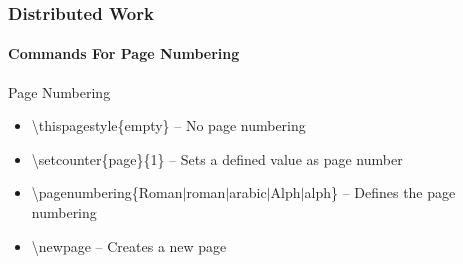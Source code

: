 \begin{frame}
\frametitle{Distributed Work}
\framesubtitle{Commands For Page Numbering}
\begin{block}{Page Numbering}
\begin{itemize}
\item \color{nounibaredI}\textbackslash thispagestyle\color{black}\{empty\} -- No page numbering
\item \color{nounibaredI}\textbackslash setcounter\color{black}\{page\}\{1\} -- Sets a defined value as page number
\item \color{nounibaredI}\textbackslash pagenumbering\color{black}\{Roman$\mid$roman$\mid$arabic$\mid$Alph$\mid$alph\} -- Defines the page numbering
\item \color{nounibaredI}\textbackslash  newpage \color{black}-- Creates a new page
\end{itemize}
\end{block}
\end{frame}
